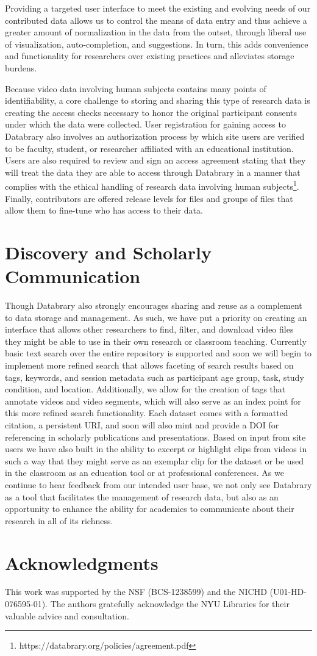 \documentclass{sig-alternate}
\begin{document}
Providing a targeted user interface to meet the existing and evolving needs of our contributed data allows us to control the means of data entry and thus achieve a greater amount of normalization in the data from the outset, through liberal use of visualization, auto-completion, and suggestions.
In turn, this adds convenience and functionality for researchers over existing practices and alleviates storage burdens.

Because video data involving human subjects contains many points of identifiability, a core challenge to storing and sharing this type of research data is creating the access checks necessary to honor the original participant consents under which the data were collected. 
User registration for gaining access to Databrary also involves an authorization process by which site users are verified to be faculty, student, or researcher affiliated with an educational institution.
Users are also required to review and sign an access agreement stating that they will treat the data they are able to access through Databrary in a manner that complies with the ethical handling of research data involving human subjects\footnote{https://databrary.org/policies/agreement.pdf}.
Finally, contributors are offered release levels for files and groups of files that allow them to fine-tune who has access to their data. 

\section{Discovery and Scholarly Communication}

Though Databrary also strongly encourages sharing and reuse as a complement to data storage and management.
As such, we have put a priority on creating an interface that allows other researchers to find, filter, and download video files they might be able to use in their own research or classroom teaching. 
Currently basic text search over the entire repository is supported and soon we will begin to implement more refined search that allows faceting of search results based on tags, keywords, and session metadata such as participant age group, task, study condition, and location.
Additionally, we allow for the creation of tags that annotate videos and video segments, which will also serve as an index point for this more refined search functionality.  
Each dataset comes with a formatted citation, a persistent URI, and soon will also mint and provide a DOI for referencing in scholarly publications and presentations.
Based on input from site users we have also built in the ability to excerpt or highlight clips from videos in such a way that they might serve as an exemplar clip for the dataset or be used in the classroom as an education tool or at professional conferences.
As we continue to hear feedback from our intended user base, we not only see Databrary as a tool that facilitates the management of research data, but also as an opportunity to enhance the ability for academics to communicate about their research in all of its richness.

\section*{Acknowledgments}

This work was supported by the NSF (BCS-1238599) and the NICHD (U01-HD-076595-01).
The authors gratefully acknowledge the NYU Libraries for their valuable advice and consultation.



\end{document}
